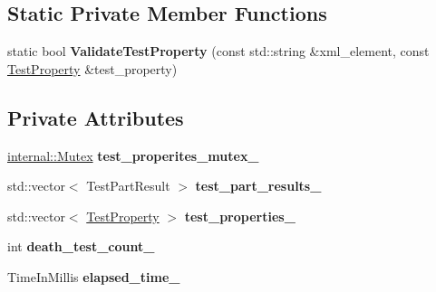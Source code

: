 \subsection*{Static Private Member Functions}
\begin{DoxyCompactItemize}
\item 
\mbox{\label{classtesting_1_1_test_result_a818c06cd2bfc00d6c81b0cebca044cb1}} 
static bool {\bfseries Validate\+Test\+Property} (const std\+::string \&xml\+\_\+element, const \mbox{\hyperlink{classtesting_1_1_test_property}{Test\+Property}} \&test\+\_\+property)
\end{DoxyCompactItemize}
\subsection*{Private Attributes}
\begin{DoxyCompactItemize}
\item 
\mbox{\label{classtesting_1_1_test_result_a58d7d97bd16a04b932e2863153c13dff}} 
\mbox{\hyperlink{classtesting_1_1internal_1_1_mutex}{internal\+::\+Mutex}} {\bfseries test\+\_\+properites\+\_\+mutex\+\_\+}
\item 
\mbox{\label{classtesting_1_1_test_result_af17c00fae1435d344b318eb6bbb56cff}} 
std\+::vector$<$ Test\+Part\+Result $>$ {\bfseries test\+\_\+part\+\_\+results\+\_\+}
\item 
\mbox{\label{classtesting_1_1_test_result_a29cde491988faff4ef2d9f9b6c13d9fa}} 
std\+::vector$<$ \mbox{\hyperlink{classtesting_1_1_test_property}{Test\+Property}} $>$ {\bfseries test\+\_\+properties\+\_\+}
\item 
\mbox{\label{classtesting_1_1_test_result_a3810b34e68f5dca9ad1237a5bde7fa21}} 
int {\bfseries death\+\_\+test\+\_\+count\+\_\+}
\item 
\mbox{\label{classtesting_1_1_test_result_a739a8ca54db4be004ba748b11e82b056}} 
Time\+In\+Millis {\bfseries elapsed\+\_\+time\+\_\+}
\end{DoxyCompactItemize}
